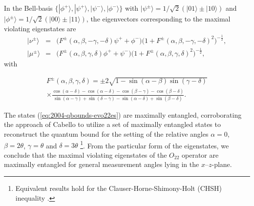 \documentclass[prl,showpacs,showkeys,amsfonts,amsmath,twocolumn]{revtex4}
\newcommand{\ket}[1]{|#1\rangle}
\begin{document}
In the Bell-basis
$\{\ket{\phi^+},\ket{\psi^+},\ket{\psi^-},\ket{\phi^-}\}$ with
$\ket{\psi^\pm} = 1/\sqrt{2}(\ket{01} \pm \ket{10})$ and
$\ket{\phi^\pm} = 1/\sqrt{2}(\ket{00} \pm \ket{11})$,
the eigenvectors corresponding to the maximal violating
eigenstates are
\begin{equation}
\begin{array}{ccl}
  \ket{\nu^\pm}&=&\big(F^\pm(\alpha,\beta,-\gamma ,-\delta  ) \psi^+ +
  \phi^-\big)\big(1+F^\pm(\alpha,\beta ,-\gamma,-\delta )^2\big)^{-\frac{1}{2}},\\
  \ket{\mu^\pm}&=&\big(F^\pm(\alpha,\beta,\gamma,\delta ) \phi^+ +
  \psi^-\big)\big(1+F^\pm(\alpha ,\beta,\gamma,\delta )^2\big)^{-\frac{1}{2}},
\end{array}
\label{eq:2004-qbounds-evo22es}
\end{equation}
with
\begin{small}
\begin{multline*}F^\pm(\alpha ,\beta ,\gamma,\delta )=\pm 2\sqrt{1-\sin(\alpha -\beta )\sin(\gamma -\delta )}\\
\times \frac{\cos(\alpha -\delta )-\cos(\alpha -\delta )-\cos(\beta -\gamma )-\cos(\beta -\delta )}
{\sin(\alpha -\gamma )+\sin(\delta -\gamma )-\sin(\alpha -\delta )
  +\sin(\beta -\delta )}.
\end{multline*}
\end{small}
The states (\ref{eq:2004-qbounds-evo22es})
are maximally entangled, corroborating the approach of
Cabello \cite{cabello-2003a} to utilize a set of
maximally entangled states to
reconstruct the quantum bound for the setting of the relative angles
$\alpha=0$, $\beta=2\theta$, $\gamma=\theta$ and $\delta=3\theta$ \footnote{
Equivalent results hold for the Clauser-Horne-Shimony-Holt (CHSH) inequality
 \cite{mermin-1995,cereceda-2001}.}.
From the
particular form of the eigenstates, we conclude that the maximal
violating eigenstates of the $O_{22}$  operator are maximally
entangled for general measurement angles lying in the $x$--$z$-plane.
\end{document}
